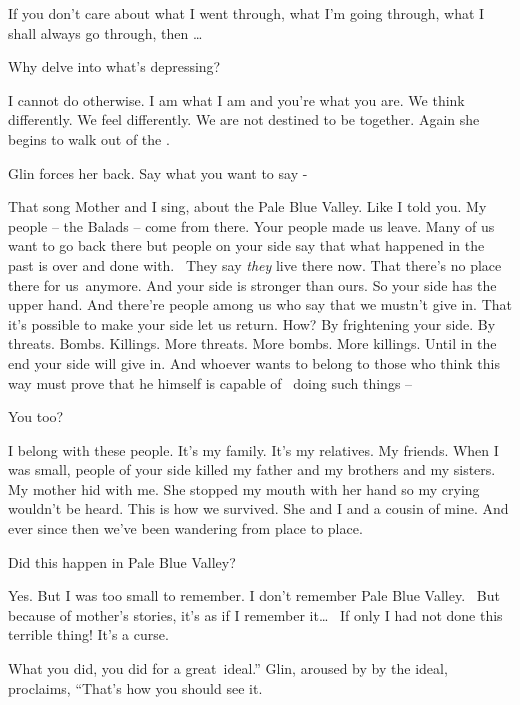 \documentclass[12pt]{book}
\begin{document}
{\textquotedbl}If you don't care about what I went through, what I'm going through, what I shall always go through, then
{\dots}{\textquotedbl}

{\textquotedbl}Why delve into what's depressing?{\textquotedbl}

{\textquotedbl}I cannot do otherwise. I am what I am and you're what you are. We think differently. We feel differently.
We are not destined to be together.{\textquotedbl} Again she begins to walk out of the .

Glin forces her back. {\textquotedbl}Say what you want to say -{\textquotedbl}

{\textquotedbl}That song Mother and I sing, about the Pale Blue Valley. Like I told you. My people -- the Balads -- come
from there. Your people made us leave. Many of us want to go back there but people on your side say that what happened
in the past is over and done with. ~They say \textit{they }live there now. That there's no place there for us~anymore.
And your side is stronger than ours. So your side has the upper hand. And there're people among us who say that we
mustn't give in. That it's possible to make your side let us return. How? By frightening your side. By threats. Bombs.
Killings. More threats. More bombs. More killings. Until in the end your side will give in. And whoever wants to belong
to those who think this way must prove that he himself is capable of~ doing such things --{\textquotedbl}

{\textquotedbl}You too?{\textquotedbl}

{\textquotedbl}I belong with these people. It's my family. It's my relatives. My friends. When I was small, people of
your side killed my father and my brothers and my sisters. My mother hid with me. She stopped my mouth with her hand so
my crying wouldn't be heard. This is how we survived. She and I and a cousin of mine. And ever since then we've been
wandering from place to place.{\textquotedbl}

{\textquotedbl}Did this happen in Pale Blue Valley?{\textquotedbl}

{\textquotedbl}Yes. But I was too small to remember. I don't remember Pale Blue Valley. ~But because of mother's
stories, it's as if I remember it{\dots} \ If only I had not done this terrible thing! It's a curse.{\textquotedbl}

{\textquotedbl}What you did, you did for a great~ideal.'' Glin, aroused by{ }by the ideal, proclaims,
``That's how you should see it.{\textquotedbl}
\end{document}
